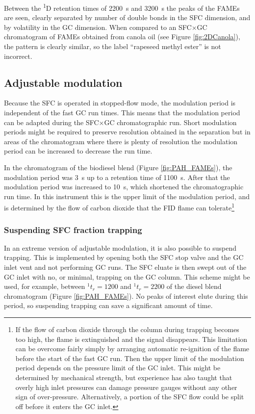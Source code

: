 Between the \textsuperscript{1}D retention times of \SI{2200}{\second} and
\SI{3200}{\second} the peaks of the FAMEs are seen, clearly separated by number
of double bonds in the SFC dimension, and by volatility in the GC dimension.
When compared to an SFC×GC chromatogram of FAMEs obtained from canola oil (see
Figure \ref{fig:2DCanola}), the pattern is clearly similar, so the label
``rapeseed methyl ester'' is not incorrect.

\subsection{Adjustable modulation}

Because the SFC is operated in stopped-flow mode, the modulation period is
independent of the fast GC run times. This means that the modulation period can
be adapted during the SFC×GC chromatographic run. Short modulation periods might
be required to preserve resolution obtained in the \oneD separation but in areas
of the chromatogram where there is plenty of resolution the modulation period
can be increased to decrease the run time.

In the chromatogram of the biodiesel blend (Figure \ref{fig:PAH_FAMEs}), the
modulation period was \SI{3}{\second} up to a \oneD retention time of
\SI{1100}{s}. After that the modulation period was increased to
\SI{10}{\second}, which shortened the chromatographic run time. In this
instrument this is the upper limit of the modulation period, and is determined
by the flow of carbon dioxide that the FID flame can tolerate\footnote{If the
flow of carbon dioxide through the column during trapping becomes too high, the
flame is extinguished and the signal disappears. This limitation can be overcome
fairly simply by arranging automatic re-ignition of the flame before the start
of the fast GC run. Then the upper limit of the modulation period depends on the
pressure limit of the GC inlet. This might be determined by mechanical strength,
but experience has also taught that overly high inlet pressures can damage
pressure gauges without any other sign of over-pressure. Alternatively, a
portion of the SFC flow could be split off before it enters the GC inlet.}

\subsubsection{Suspending SFC fraction trapping}

In an extreme version of adjustable modulation, it is also possible to suspend
trapping. This is implemented by opening both the SFC stop valve and the GC
inlet vent and not performing GC runs. The SFC eluate is then swept out of the GC
inlet with no, or minimal, trapping on the GC column. This scheme might be used,
for example, between \(^{1}t_r = 1200\) and \(^{1}t_r = 2200\) of the diesel
blend chromatogram (Figure \ref{fig:PAH_FAMEs}). No peaks of interest elute
during this period, so suspending trapping can save a significant amount of
time.

